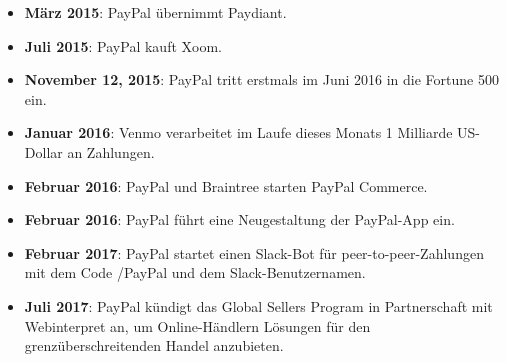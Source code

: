 \documentclass[10pt]{article}
\begin{document}
\begin{itemize}[label=\textbullet]
    \item \textbf{März 2015}: PayPal übernimmt Paydiant.    
    \item \textbf{Juli 2015}: PayPal kauft Xoom.    
    \item \textbf{November 12, 2015}: PayPal tritt erstmals im Juni 2016 in die Fortune 500 ein.    
    \item \textbf{Januar 2016}: Venmo verarbeitet im Laufe dieses Monats 1 Milliarde US-Dollar an Zahlungen.    
    \item \textbf{Februar 2016}: PayPal und Braintree starten PayPal Commerce.    
    \item \textbf{Februar 2016}: PayPal führt eine Neugestaltung der PayPal-App ein.    
    \item \textbf{Februar 2017}: PayPal startet einen Slack-Bot für peer-to-peer-Zahlungen mit dem Code /PayPal und dem Slack-Benutzernamen.
    \item \textbf{Juli 2017}: PayPal kündigt das Global Sellers Program in Partnerschaft mit Webinterpret an, um Online-Händlern Lösungen für den grenzüberschreitenden Handel anzubieten.

\end{itemize}
\end{document}
